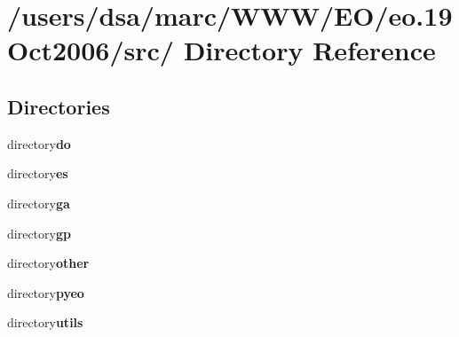 \section{/users/dsa/marc/WWW/EO/eo.19Oct2006/src/ Directory Reference}
\label{dir_000000}
\subsection*{Directories}
\begin{CompactItemize}
\item 
directory{\bf do}
\item 
directory{\bf es}
\item 
directory{\bf ga}
\item 
directory{\bf gp}
\item 
directory{\bf other}
\item 
directory{\bf pyeo}
\item 
directory{\bf utils}
\end{CompactItemize}
